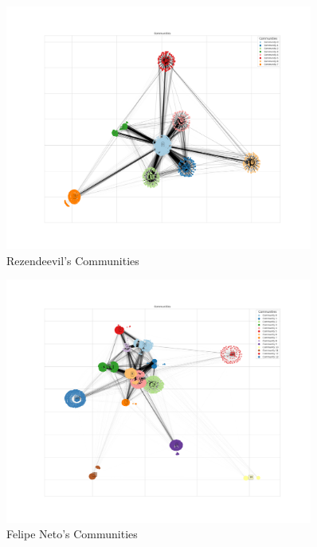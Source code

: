 \documentclass[12pt]{article}
\begin{document}
\begin{figure}[t!]
    \centering
    \includegraphics[keepaspectratio,width=0.9\textwidth]{./imgs/rezendeevil/communities.png}
    \caption[width=\textwidth]{Rezendeevil's Communities}
    \label{fig:rezendeevil_comm}
\end{figure}

\begin{figure}[t!]
    \centering
    \includegraphics[keepaspectratio,width=0.9\textwidth]{./imgs/felipeneto/communities.png}
    \caption[width=\textwidth]{Felipe Neto's Communities}
    \label{fig:felipeneto_comm}
\end{figure}




\end{document}
